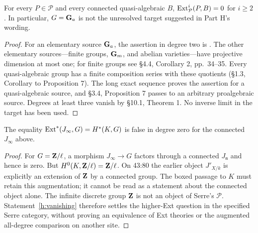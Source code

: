 \begin{proposition}\label{h:additive}
For every $P\in\mathcal P$ and every connected quasi-algebraic $B$,
$\operatorname{Ext}^i_{\mathcal P}(P,B)=0$ for $i\geq2$.
In particular, $G=\mathbf G_a$ is not the unresolved target suggested in
Part H's wording.
\end{proposition}
\begin{proof}
For an elementary source $\mathbf G_a$, the assertion in degree two is
\cite[\S8.6, Corollary 5, p.~58]{Serre1960}. The other elementary
sources---finite groups, $\mathbf G_m$, and abelian varieties---have
projective dimension at most one; for finite groups see \S4.4,
Corollary 2, pp.~34--35. Every quasi-algebraic group has a finite
composition series with these quotients (\S1.3, Corollary to
Proposition 7). The long exact sequence proves the assertion for a
quasi-algebraic source, and \S3.4, Proposition 7 passes to an arbitrary
proalgebraic source. Degrees at least three vanish by \S10.1,
Theorem 1. No inverse limit in the target has been used.
\end{proof}

\begin{proposition}
\label{h:augmentation}
The equality $\operatorname{Ext}^*(J_\infty,G)=H^*(K,G)$ is false in degree zero
for the connected $J_\infty$ above.
\end{proposition}
\begin{proof}
For $G=\mathbf Z/\ell$, a morphism $J_\infty\to G$ factors through a
connected $J_{\mathfrak n}$ and hence is zero. But
$H^0(K,\mathbf Z/\ell)=\mathbf Z/\ell$. On 43:80 the earlier object
$J'_{X/k}$ is explicitly an extension of $\mathbf Z$ by a connected group.
The boxed passage to $K$ must retain this augmentation; it cannot be
read as a statement about the connected object alone. The infinite
discrete group $\mathbf Z$ is not an object of Serre's $\mathcal P$.
Statement~\ref{h:vanishing} therefore settles the higher-Ext question
in the specified Serre category, without proving an equivalence of
Ext theories or the augmented all-degree comparison on another site.
\end{proof}

